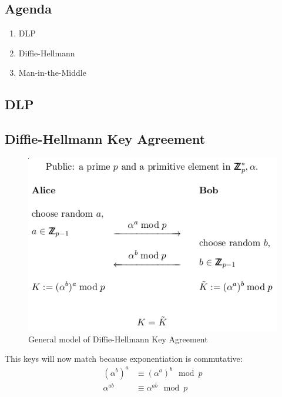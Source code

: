 

\subsection*{Agenda}
\begin{enumerate}
\item DLP
\item Diffie-Hellmann
\item Man-in-the-Middle
\end{enumerate}

\subsection{DLP}


\subsection{Diffie-Hellmann Key Agreement}
\begin{figure}[H]
  \begin{centering}
    \includegraphics[width=12cm]{images/11-diffie}
    \caption{General model of Diffie-Hellmann Key Agreement}
  \end{centering}
  \label{fig:diffie}
\end{figure}

This keys will now match because exponentiation is commutative:
\begin{align*}
  (\alpha^b)^a &\equiv (\alpha^a)^b \mod p \\
  \alpha^{ab} &\equiv \alpha^{ab} \mod p
\end{align*}

